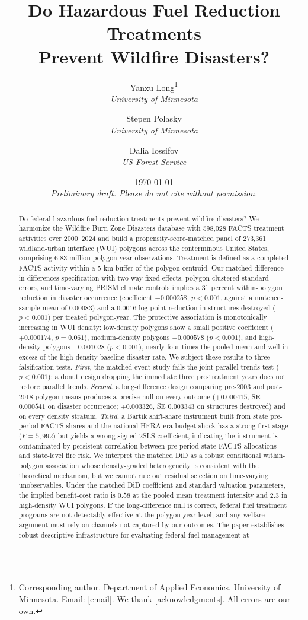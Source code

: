 \documentclass[12pt, letterpaper]{article}
\title{\textbf{Do Hazardous Fuel Reduction Treatments\\ Prevent Wildfire Disasters?}\\[0.4em]}
\author{
Yanxu Long\thanks{Corresponding author. Department of Applied Economics, University of Minnesota. Email: [email]. We thank [acknowledgments]. All errors are our own.} \\
\textit{University of Minnesota}
\and
Stepen Polasky\\
\textit{University of Minnesota}
\and
Dalia Iossifov\\
\textit{US Forest Service}
}
\date{\today \\[1em] \textit{Preliminary draft. Please do not cite without permission.}}
\begin{document}
\maketitle
\thispagestyle{empty}

\begin{abstract}
\noindent
Do federal hazardous fuel reduction treatments prevent wildfire disasters? We harmonize the Wildfire Burn Zone Disasters database with 598,028 FACTS treatment activities over 2000--2024 and build a propensity-score-matched panel of 273,361 wildland-urban interface (WUI) polygons across the conterminous United States, comprising 6.83 million polygon-year observations. Treatment is defined as a completed FACTS activity within a 5 km buffer of the polygon centroid. Our matched difference-in-differences specification with two-way fixed effects, polygon-clustered standard errors, and time-varying PRISM climate controls implies a 31 percent within-polygon reduction in disaster occurrence (coefficient $-0.000258$, $p < 0.001$, against a matched-sample mean of $0.00083$) and a $0.0016$ log-point reduction in structures destroyed ($p < 0.001$) per treated polygon-year. The protective association is monotonically increasing in WUI density: low-density polygons show a small positive coefficient ($+0.000174$, $p = 0.061$), medium-density polygons $-0.000578$ ($p < 0.001$), and high-density polygons $-0.001028$ ($p < 0.001$), nearly four times the pooled mean and well in excess of the high-density baseline disaster rate. We subject these results to three falsification tests. \textit{First}, the matched event study fails the joint parallel trends test ($p < 0.001$); a donut design dropping the immediate three pre-treatment years does not restore parallel trends. \textit{Second}, a long-difference design comparing pre-2003 and post-2018 polygon means produces a precise null on every outcome ($+0.000415$, SE $0.000541$ on disaster occurrence; $+0.003326$, SE $0.003343$ on structures destroyed) and on every density stratum. \textit{Third}, a Bartik shift-share instrument built from state pre-period FACTS shares and the national HFRA-era budget shock has a strong first stage ($F = 5{,}992$) but yields a wrong-signed 2SLS coefficient, indicating the instrument is contaminated by persistent correlation between pre-period state FACTS allocations and state-level fire risk. We interpret the matched DiD as a robust conditional within-polygon association whose density-graded heterogeneity is consistent with the theoretical mechanism, but we cannot rule out residual selection on time-varying unobservables. Under the matched DiD coefficient and standard valuation parameters, the implied benefit-cost ratio is $0.58$ at the pooled mean treatment intensity and $2.3$ in high-density WUI polygons. If the long-difference null is correct, federal fuel treatment programs are not detectably effective at the polygon-year level, and any welfare argument must rely on channels not captured by our outcomes. The paper establishes robust descriptive infrastructure for evaluating federal fuel management at 
\end{abstract}
\end{document}
